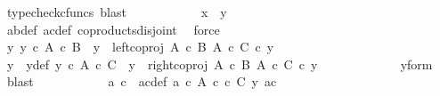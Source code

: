 \begin{isabellebody}
\ {\isacharparenleft}{\kern0pt}typecheck{\isacharunderscore}{\kern0pt}cfuncs{\isacharcomma}{\kern0pt}\ blast{\isacharparenright}{\kern0pt}\isanewline
\ \ \ \ \ \ \ \ \isamarkupfalse%
\ \isamarkupfalse%
\ {\isachardoublequoteopen}x\ {\isacharequal}{\kern0pt}\ y{\isachardoublequoteclose}\isanewline
\ \ \ \ \ \ \ \ \ \ \isamarkupfalse%
\ a{\isacharprime}{\kern0pt}b{\isacharprime}{\kern0pt}{\isacharunderscore}{\kern0pt}def\ ac{\isacharunderscore}{\kern0pt}def\ coproducts{\isacharunderscore}{\kern0pt}disjoint\ \isamarkupfalse%
\ force\isanewline
\ \ \ \ \ \ \isamarkupfalse%
\ \isanewline
\ \ \ \ \ \ \ \ \isamarkupfalse%
\ {\isachardoublequoteopen}{\isasymnexists}y{\isacharprime}{\kern0pt}{\isachardot}{\kern0pt}\ y{\isacharprime}{\kern0pt}\ {\isasymin}\isactrlsub c\ A\ {\isasymtimes}\isactrlsub c\ B\ {\isasymand}\ y\ {\isacharequal}{\kern0pt}\ left{\isacharunderscore}{\kern0pt}coproj\ {\isacharparenleft}{\kern0pt}A\ {\isasymtimes}\isactrlsub c\ B{\isacharparenright}{\kern0pt}\ {\isacharparenleft}{\kern0pt}A\ {\isasymtimes}\isactrlsub c\ C{\isacharparenright}{\kern0pt}\ {\isasymcirc}\isactrlsub c\ y{\isacharprime}{\kern0pt}{\isachardoublequoteclose}\isanewline
\ \ \ \ \ \ \ \ \isamarkupfalse%
\ \isamarkupfalse%
\ y{\isacharprime}{\kern0pt}\ \ y{\isacharprime}{\kern0pt}{\isacharunderscore}{\kern0pt}def{\isacharcolon}{\kern0pt}\ {\isachardoublequoteopen}y{\isacharprime}{\kern0pt}\ {\isasymin}\isactrlsub c\ {\isacharparenleft}{\kern0pt}A\ {\isasymtimes}\isactrlsub c\ C{\isacharparenright}{\kern0pt}\ {\isasymand}\ y\ {\isacharequal}{\kern0pt}\ right{\isacharunderscore}{\kern0pt}coproj\ {\isacharparenleft}{\kern0pt}A\ {\isasymtimes}\isactrlsub c\ B{\isacharparenright}{\kern0pt}\ {\isacharparenleft}{\kern0pt}A\ {\isasymtimes}\isactrlsub c\ C{\isacharparenright}{\kern0pt}\ {\isasymcirc}\isactrlsub c\ y{\isacharprime}{\kern0pt}{\isachardoublequoteclose}\isanewline
\ \ \ \ \ \ \ \ \ \ \isamarkupfalse%
\ \ y{\isacharunderscore}{\kern0pt}form\ \isamarkupfalse%
\ blast\isanewline
\ \ \ \ \ \ \ \ \isamarkupfalse%
\ \isamarkupfalse%
\ a{\isacharprime}{\kern0pt}\ c{\isacharprime}{\kern0pt}\ \ a{\isacharprime}{\kern0pt}c{\isacharprime}{\kern0pt}{\isacharunderscore}{\kern0pt}def{\isacharcolon}{\kern0pt}\ {\isachardoublequoteopen}a{\isacharprime}{\kern0pt}\ {\isasymin}\isactrlsub c\ A{\isachardoublequoteclose}\ {\isachardoublequoteopen}c{\isacharprime}{\kern0pt}\ {\isasymin}\isactrlsub c\ C{\isachardoublequoteclose}\ {\isachardoublequoteopen}y{\isacharprime}{\kern0pt}\ {\isacharequal}{\kern0pt}{\isasymlangle}a{\isacharprime}{\kern0pt}{\isacharcomma}{\kern0pt}c{\isacharprime}{\kern0pt}{\isasymrangle}{\isachardoublequoteclose}\isanewline

\end{isabellebody}
